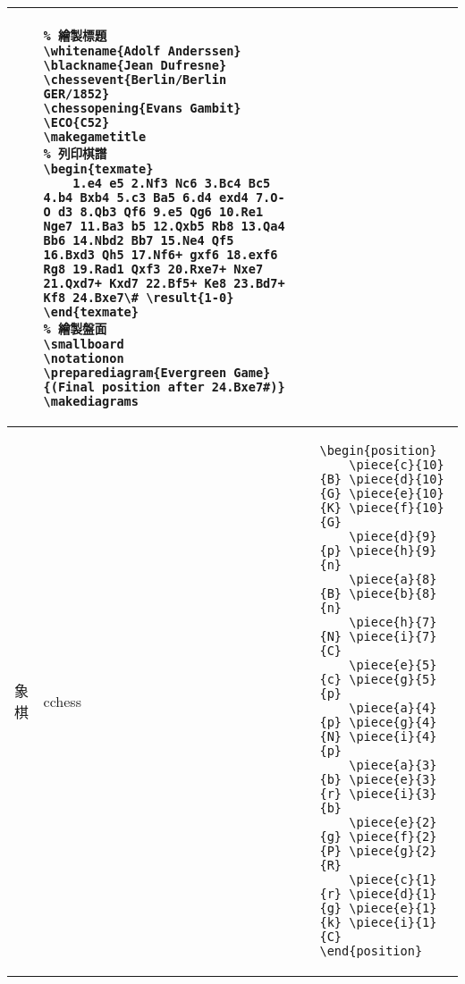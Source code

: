 \documentclass{../indiv}
\begin{document}
{\begin{table}[H]
\begin{tabular}{Z}
\begin{tabmp}
					\centering
					\tabfig[0.85]{\makediagrams}
				\end{tabmp} &
				\begin{tabmp}[-0.2]
					\begin{verbatim}
% 繪製標題
\whitename{Adolf Anderssen}
\blackname{Jean Dufresne}
\chessevent{Berlin/Berlin GER/1852}
\chessopening{Evans Gambit}
\ECO{C52}
\makegametitle
% 列印棋譜
\begin{texmate}
	1.e4 e5 2.Nf3 Nc6 3.Bc4 Bc5 4.b4 Bxb4 5.c3 Ba5 6.d4 exd4 7.O-O d3 8.Qb3 Qf6 9.e5 Qg6 10.Re1 Nge7 11.Ba3 b5 12.Qxb5 Rb8 13.Qa4 Bb6 14.Nbd2 Bb7 15.Ne4 Qf5 16.Bxd3 Qh5 17.Nf6+ gxf6 18.exf6 Rg8 19.Rad1 Qxf3 20.Rxe7+ Nxe7 21.Qxd7+ Kxd7 22.Bf5+ Ke8 23.Bd7+ Kf8 24.Bxe7\# \result{1-0}
\end{texmate}
% 繪製盤面
\smallboard
\notationon
\preparediagram{Evergreen Game}{(Final position after 24.Bxe7#)}
\makediagrams
					\end{verbatim}
				\end{tabmp} \\ \hline
				象棋 & cchess &
				\begin{tabmp}
					\centering
				\end{tabmp} &
				\begin{tabmp}[-0.2]
					\begin{verbatim}
\begin{position}
	\piece{c}{10}{B} \piece{d}{10}{G} \piece{e}{10}{K} \piece{f}{10}{G}
	\piece{d}{9}{p} \piece{h}{9}{n}
	\piece{a}{8}{B} \piece{b}{8}{n}
	\piece{h}{7}{N} \piece{i}{7}{C}
	\piece{e}{5}{c} \piece{g}{5}{p}
	\piece{a}{4}{p} \piece{g}{4}{N} \piece{i}{4}{p}
	\piece{a}{3}{b} \piece{e}{3}{r} \piece{i}{3}{b}
	\piece{e}{2}{g} \piece{f}{2}{P} \piece{g}{2}{R}
	\piece{c}{1}{r} \piece{d}{1}{g} \piece{e}{1}{k} \piece{i}{1}{C}
\end{position}
					\end{verbatim}
				\end{tabmp} \\ \hline

\end{tabular}
\end{table}}
\end{document}

